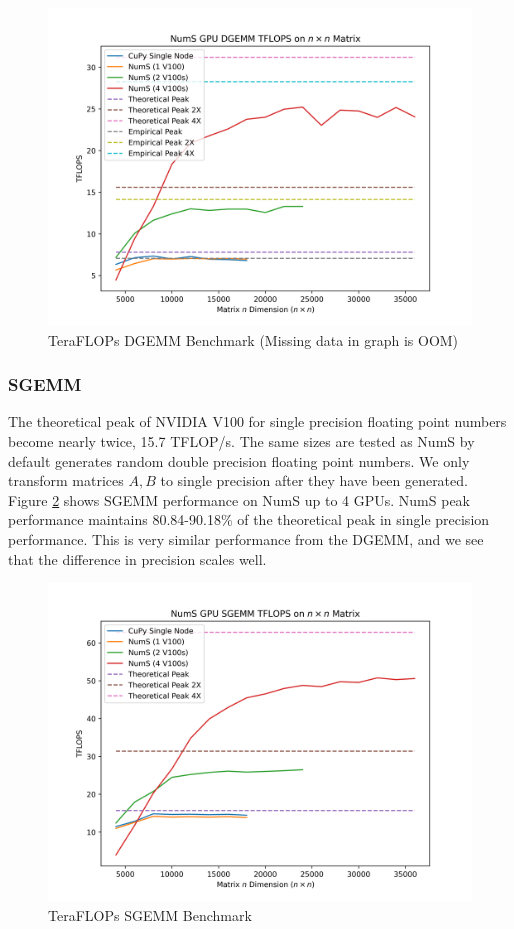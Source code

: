 \documentclass{article}
\begin{document}
\begin{figure}
  \centerline{\includegraphics[width=5in]{figures/NumS_GPU_TFLOPS_DGEMM.png}}
  \caption{TeraFLOPs DGEMM Benchmark (Missing data in graph is OOM)}
  \label{fig:dgemm}
\end{figure}

\subsubsection{SGEMM}
The theoretical peak of NVIDIA V100 for single precision floating point numbers become nearly twice, 15.7 TFLOP/s. The same sizes are tested as NumS by default generates random double precision floating point numbers. We only transform matrices $A, B$ to single precision after they have been generated. Figure \ref{fig:sgemm} shows SGEMM performance on NumS up to 4 GPUs. NumS peak performance maintains 80.84-90.18\% of the theoretical peak in single precision performance. This is very similar performance from the DGEMM, and we see that the difference in precision scales well.

\begin{figure}
  \centerline{\includegraphics[width=5in]{figures/NumS_GPU_TFLOPS_SGEMM.png}}
  \caption{TeraFLOPs SGEMM Benchmark}
  \label{fig:sgemm}
\end{figure}
\end{document}
